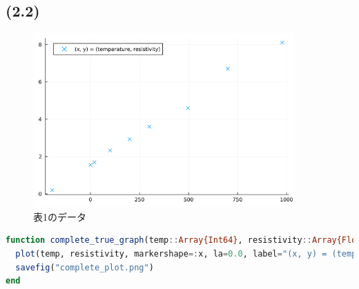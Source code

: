 \documentclass[uplatex, dvipdfmx, a4j,11pt]{jsarticle}
\begin{document}
\subsection*{(2.2)}
\begin{figure}[h]
  \begin{center}
    \includegraphics[width=100mm]{complete_plot.png}
    \caption{表1のデータ}
  \end{center}
\end{figure}
\begin{lstlisting}[title={(2-2)}, label=code:in, language=Julia]
function complete_true_graph(temp::Array{Int64}, resistivity::Array{Float64})
  plot(temp, resistivity, markershape=:x, la=0.0, label="(x, y) = (temparature, resistivity)")
  savefig("complete_plot.png")
end
\end{lstlisting}

\newpage
\end{document}
